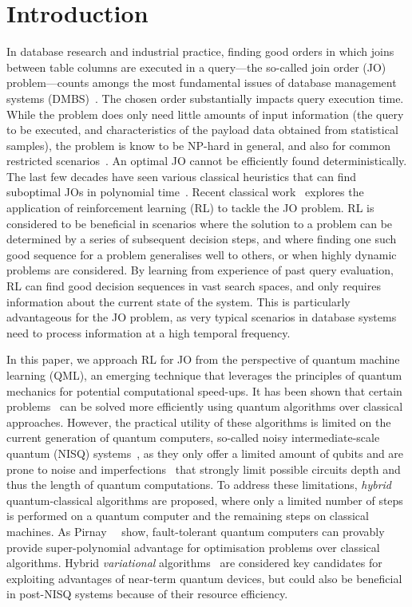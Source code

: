 \documentclass[10pt, conference]{IEEEtran}
\begin{document}
\section{Introduction}
\label{sec:intro}
In database research and industrial practice, finding
good orders in which joins between table columns are
executed in a query---the so-called
join order (JO) problem---counts amongs the most fundamental issues
of database management systems (DMBS)~\cite{steinbrunn97, neumann09, neumann18, trummer17, han09, kolchinsky18, goncalves14, Leis.2018, Moerkotte.2020}. The chosen order
substantially impacts query execution time.
While the problem does only need little amounts of input information (the query
to be executed, and characteristics of the payload data 
obtained from statistical samples), the problem is know to be NP-hard in
general, and also for common restricted scenarios~\cite{cluet95}. An optimal JO cannot be efficiently found deterministically. The last few decades have seen various classical heuristics that can find suboptimal JOs in polynomial time~\cite{swami89, krishnamurthy86, selinger79}.
Recent classical work~\cite{marcus18, marcus19, krishnan18, trummer21, chen22, xiang20, wang2023, ji2023} explores the application of reinforcement learning (RL) to tackle the JO problem.
RL is considered to be beneficial in scenarios where the solution to a problem can be
determined by a series of subsequent decision steps, and where finding one such good sequence for a problem generalises well to others, or when highly dynamic problems are
considered.  By learning from experience of past query evaluation, RL can find good
decision sequences in vast search spaces, and only requires information about the current 
state of the system. This is particularly advantageous for the JO problem,
as very typical scenarios in database systems need to process information at 
a high temporal frequency.

In this paper, we approach RL for JO from the perspective of quantum machine learning (QML), an emerging technique that leverages the principles of quantum mechanics for potential computational speed-ups.
It has been shown that certain problems~\cite{shor99, grover96} can be solved more efficiently using quantum algorithms over classical approaches.
However, the practical utility of these algorithms is limited on the current generation of quantum computers, so-called noisy intermediate-scale quantum (NISQ) systems~\cite{preskill18}, as they only offer a limited amount of qubits and are prone to noise and imperfections~\cite{greiwe23} that strongly limit possible circuits depth and thus the length of quantum computations.
To address these limitations, \emph{hybrid} quantum-classical algorithms are proposed, where only a limited number of steps is performed on a quantum computer and the remaining steps on classical machines.
As Pirnay~\etal~\cite{pirnay23} show, fault-tolerant quantum computers can provably
provide super-polynomial advantage for optimisation problems over classical algorithms. 
Hybrid \emph{variational} algorithms~\cite{farhi14, mclean16, cerezo21} are considered 
key candidates for exploiting advantages of near-term quantum devices, but
could also be beneficial in post-NISQ systems because of their resource efficiency.
\end{document}
